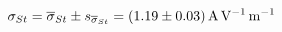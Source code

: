 
\begin{equation}
    \sigma_{St}
        = \overline{\sigma}_{St} \pm s_{\overline{\sigma}_{St}}
        = \SI[separate-uncertainty = true]{1.19 \pm 0.03 }{\ampere\per\volt\per\meter}
\end{equation}
